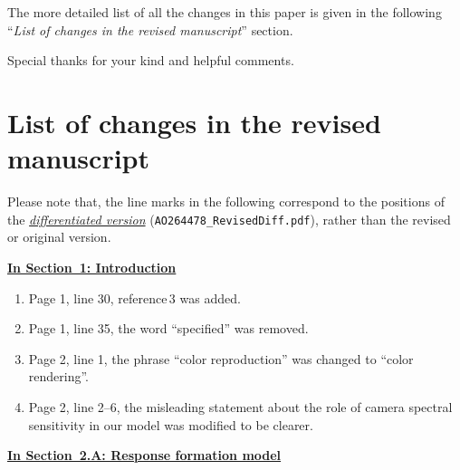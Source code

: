\documentclass[12pt]{article}
\newcounter{comment}
\begin{document}
	\bigskip
	
	The more detailed list of all the changes in this paper is given in the following ``\textit{List of changes in the revised manuscript}'' section.
	
	Special thanks for your kind and helpful comments.
	
	\clearpage
	
	\section*{\selectfont List of changes in the revised manuscript}
	
	Please note that, the line marks in the following correspond to the positions of the \textit{\underline{differentiated version}} (\verb|AO264478_RevisedDiff.pdf|), rather than the revised or original version.
	
	\bigskip
	
	\noindent\underline{\textbf{{\large In Section~1: Introduction}}}
	
	\begin{enumerate}
		\item Page 1, line 30, reference\,3 was added.
		
		\item Page 1, line 35, the word ``specified'' was removed.
		
		\item Page 2, line 1, the phrase ``color reproduction'' was changed to ``color rendering''.
		
		\item Page 2, line 2--6, the misleading statement about the role of camera spectral sensitivity in our model was modified to be clearer.
	\end{enumerate}
	
	\noindent\underline{\textbf{{\large In Section~2.A: Response formation model}}}
	
\end{document}
